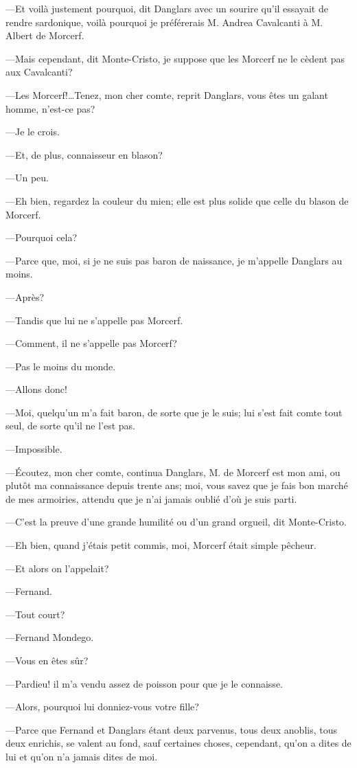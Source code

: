 —Et voilà justement pourquoi, dit Danglars avec un sourire qu'il essayait de rendre sardonique, voilà pourquoi je préférerais M. Andrea Cavalcanti à M. Albert de Morcerf. 

—Mais cependant, dit Monte-Cristo, je suppose que les Morcerf ne le cèdent pas aux Cavalcanti? 

—Les Morcerf!\dots Tenez, mon cher comte, reprit Danglars, vous êtes un galant homme, n'est-ce pas? 

—Je le crois. 

—Et, de plus, connaisseur en blason? 

—Un peu. 

—Eh bien, regardez la couleur du mien; elle est plus solide que celle du blason de Morcerf. 

—Pourquoi cela? 

—Parce que, moi, si je ne suis pas baron de naissance, je m'appelle Danglars au moins. 

—Après? 

—Tandis que lui ne s'appelle pas Morcerf. 

—Comment, il ne s'appelle pas Morcerf? 

—Pas le moins du monde. 

—Allons donc! 

—Moi, quelqu'un m'a fait baron, de sorte que je le suis; lui s'est fait comte tout seul, de sorte qu'il ne l'est pas. 

—Impossible. 

—Écoutez, mon cher comte, continua Danglars, M. de Morcerf est mon ami, ou plutôt ma connaissance depuis trente ans; moi, vous savez que je fais bon marché de mes armoiries, attendu que je n'ai jamais oublié d'où je suis parti. 

—C'est la preuve d'une grande humilité ou d'un grand orgueil, dit Monte-Cristo. 

—Eh bien, quand j'étais petit commis, moi, Morcerf était simple pêcheur. 

—Et alors on l'appelait? 

—Fernand. 

—Tout court? 

—Fernand Mondego. 

—Vous en êtes sûr? 

—Pardieu! il m'a vendu assez de poisson pour que je le connaisse. 

—Alors, pourquoi lui donniez-vous votre fille? 

—Parce que Fernand et Danglars étant deux parvenus, tous deux anoblis, tous deux enrichis, se valent au fond, sauf certaines choses, cependant, qu'on a dites de lui et qu'on n'a jamais dites de moi. 


